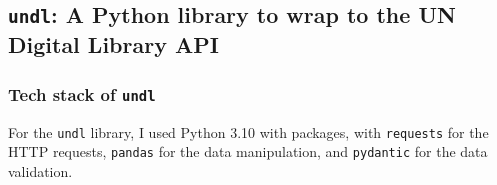 
\subsection{\texttt{undl}: A Python library to wrap to the UN Digital Library API} \label{ssec:undl-a-python-library-to-wrap-to-the-un-digital-library-api}

\subsubsection*{Tech stack of \texttt{undl}} \label{sssec:tech-stack-of-undl}

For the \texttt{undl} library, I used Python 3.10 with packages, with \texttt{requests} for the HTTP requests, \texttt{pandas} for the data manipulation, and \texttt{pydantic} for the data validation.



